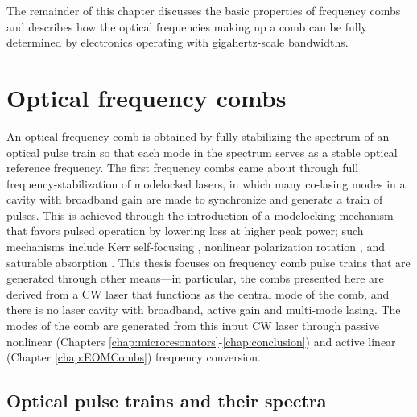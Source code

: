 The remainder of this chapter discusses the basic properties of frequency combs and describes how the optical frequencies making up a comb can be fully determined by electronics operating with gigahertz-scale bandwidths.

\section{Optical frequency combs}

An optical frequency comb is obtained by fully stabilizing the spectrum of an optical pulse train so that each mode in the spectrum serves as a stable optical reference frequency. The first frequency combs came about through full frequency-stabilization of modelocked lasers, in which many co-lasing modes in a cavity with broadband gain are made to synchronize and generate a train of pulses. This is achieved through the introduction of a modelocking mechanism that favors pulsed operation by lowering loss at higher peak power; such mechanisms include Kerr self-focusing \cite{Spence1991,Brabec1992}, nonlinear polarization rotation \cite{Hofer1992,Fermann1993}, and saturable absorption \cite{Stankov1988}. This thesis focuses on frequency comb pulse trains that are generated through other means---in particular, the combs presented here are derived from a CW laser that functions as the central mode of the comb, and there is no laser cavity with broadband, active gain and multi-mode lasing. The modes of the comb are generated from this input CW laser through passive nonlinear (Chapters \ref{chap:microresonators}-\ref{chap:conclusion}) and active linear (Chapter \ref{chap:EOMCombs}) frequency conversion.

\subsection{Optical pulse trains and their spectra}

